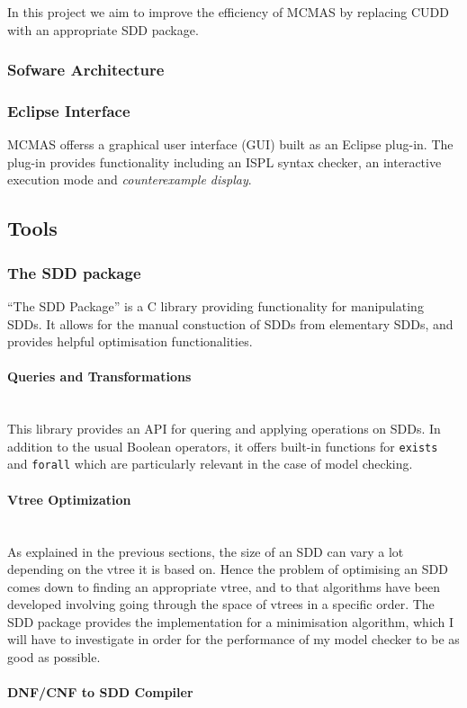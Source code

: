 \documentclass{article}
\newcommand{\myparagraph}[1]{\paragraph{#1}\mbox{}\\}
\begin{document}
In this project we aim to improve the efficiency of MCMAS by replacing CUDD with an appropriate SDD package.

\subsubsection{Sofware Architecture}

 
 \subsubsection{Eclipse Interface}

 MCMAS offerss a graphical user interface (GUI) built as an Eclipse plug-in. The plug-in provides functionality including an ISPL syntax checker, an interactive execution mode and \emph{counterexample display}. 
 

\subsection{Tools}

\subsubsection{The SDD package} 

\cite{SDD_website}
``The SDD Package'' is a C library providing functionality for manipulating SDDs. It allows for the manual constuction of SDDs from elementary SDDs, and provides helpful optimisation functionalities.

\myparagraph{Queries and Transformations}

This library provides an API for quering and applying operations on SDDs. In addition to the usual Boolean operators, it offers built-in functions for \texttt{exists} and \texttt{forall} which are particularly relevant in the case of model checking. 

\myparagraph{Vtree Optimization}

As explained in the previous sections, the size of an SDD can vary a lot depending on the vtree it is based on. Hence the problem of optimising an SDD comes down to finding an appropriate vtree, and to that algorithms have been developed involving going through the space of vtrees in a specific order. The SDD package provides the implementation for a minimisation algorithm, which I will have to investigate in order for the performance of my model checker to be as good as possible.

\myparagraph{DNF/CNF to SDD Compiler}
\end{document}

